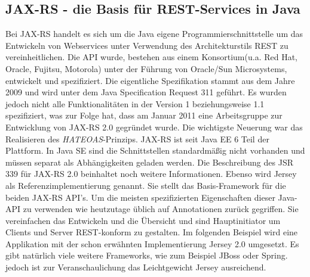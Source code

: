 \documentclass[fleqn,10.5pt,ngerman]{SelfArx}
\begin{document}
\subsection{JAX-RS - die Basis für REST-Services in Java}
Bei JAX-RS handelt es sich um die Java eigene Programmierschnittstelle um das Entwickeln von Webservices unter Verwendung des Architekturstils REST zu vereinheitlichen. Die API wurde, bestehen aus einem Konsortium(u.a. Red Hat, Oracle, Fujitsu, Motorola) unter der Führung von Oracle/Sun Microsystems, entwickelt und spezifiziert. Die eigentliche Spezifikation \cite{jaxrs1.1} stammt aus dem Jahre 2009 und wird unter dem Java Specification Request \cite{spezreq} 311 geführt. Es wurden jedoch nicht alle Funktionalitäten in der Version 1 beziehungsweise 1.1 spezifiziert, was zur Folge hat, dass am Januar 2011 eine Arbeitsgruppe zur Entwicklung von JAX-RS 2.0 gegründet wurde. Die wichtigste Neuerung war das Realisieren des \textit{HATEOAS}-Prinzips. JAX-RS ist seit Java EE 6 Teil der Plattform. In Java SE sind die Schnittstellen standardmäßig nicht vorhanden und müssen separat als Abhängigkeiten geladen werden. Die Beschreibung des JSR 339 für JAX-RS 2.0 \cite{spezJSR339} beinhaltet noch weitere Informationen. Ebenso wird Jersey \cite{jersey} als Referenzimplementierung genannt. Sie stellt das Basis-Framework für die beiden JAX-RS API's. Um die meisten spezifizierten Eigenschaften dieser Java-API zu verwenden wie heutzutage üblich auf Annotationen zurück gegriffen. Sie vereinfachen das Entwickeln und die Übersicht und sind Hauptinitiator um Clients und Server REST-konform zu gestalten. Im folgenden Beispiel wird eine Applikation mit der schon erwähnten Implementierung Jersey 2.0 umgesetzt. Es gibt natürlich viele weitere Frameworks, wie zum Beispiel JBoss oder Spring. jedoch ist zur Veranschaulichung das Leichtgewicht Jersey ausreichend.
\end{document}
